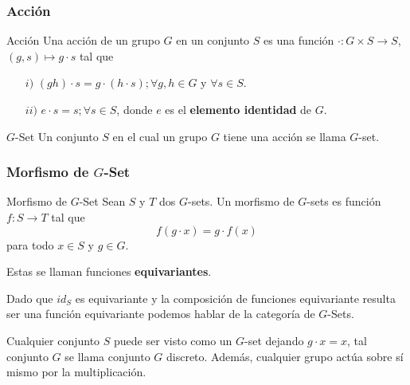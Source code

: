 \documentclass[11pt,spanish]{beamer}
\theoremstyle{mystyle}
\begin{document}
    \begin{frame}
    	\frametitle{Acción}
    	\begin{block}{Acción}
    		Una acción de un grupo $G$ en un conjunto $S$ es una función 
    		$\cdot : G \times S \to S$, $(g, s) \mapsto g \cdot s $  tal que
    		\begin{itemize}
    			\item[$i)$] $(gh)\cdot s = g \cdot (h \cdot s); \forall g, h \in G$ y $\forall s \in S$.
    			\item[$ii)$] $e \cdot s = s; \forall s \in S$, donde $e$ es el \textbf{elemento identidad} de $G$.
    		\end{itemize}
    	\end{block}
        \begin{block}{$G$-Set}
        	Un conjunto $S$ en el cual un grupo $G$ tiene una acci\'on se llama $G$-set.
        \end{block}
    \end{frame}

    \begin{frame}
    	\frametitle{Morfismo de $G$-Set}
    	
    	\begin{block}{Morfismo de $G$-Set}
    		Sean $S$ y $T$ dos $G$-sets. Un morfismo de $G$-sets es función
    		$f : S \to T$ tal que
    		$$ f (g \cdot  x) = g \cdot f(x)$$
    		para todo $x\in S$ y $g \in G$.
    	\end{block}
    
    	Estas se llaman funciones \textbf{equivariantes}.
    	
    	Dado que $id_{S}$ es equivariante y la composición de funciones equivariante
    	resulta ser una función equivariante podemos hablar de la categoría de $G$-Sets.
    	
    	Cualquier conjunto $S$ puede ser visto como un $G$-set dejando $g \cdot x = x$,
    	tal conjunto $G$ se llama conjunto $G$ discreto. Además, cualquier grupo actúa
    	sobre sí mismo por la multiplicación.    	
    \end{frame}

%     
%
\end{document}
